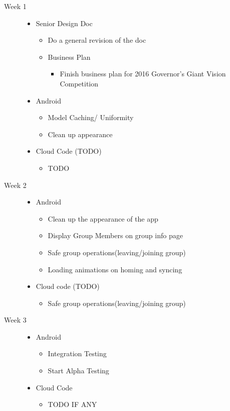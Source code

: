 \documentclass[11pt]{article}
\begin{document}
\begin{description}
	\item[Week 1] \hfill
		\begin{itemize}
		\item Senior Design Doc
		\begin{itemize}
			\item Do a general revision of the doc
		\end{itemize}
		\begin{itemize}
		\item Business Plan
			\begin{itemize}
			\item Finish business plan for 2016 Governor's Giant Vision Competition
			\end{itemize}
		\end{itemize}
		\item Android
		\begin{itemize}
			\item Model Caching/ Uniformity
			\item Clean up appearance
		\end{itemize}
		\item Cloud Code (TODO)
		\begin{itemize}
			\item TODO
		\end{itemize}
	\end{itemize}
	
  \item[Week 2] \hfill
		\begin{itemize}
		\item Android
		\begin{itemize}
			\item Clean up the appearance of the app
			\item Display Group Members on group info page
			\item Safe group operations(leaving/joining group)
			\item Loading animations on homing and syncing
		\end{itemize}
		\item Cloud code (TODO)
		\begin{itemize}
			\item Safe group operations(leaving/joining group)
		\end{itemize}
	\end{itemize}
  
  \item[Week 3] \hfill
		\begin{itemize}
		\item Android
		\begin{itemize}
			\item Integration Testing
			\item Start Alpha Testing
		\end{itemize}
		\item Cloud Code
		\begin{itemize}
			\item TODO IF ANY
		\end{itemize}
	\end{itemize}
\end{description}
\end{document}
